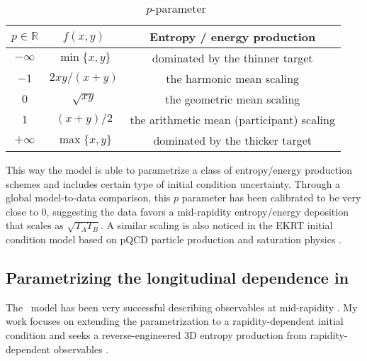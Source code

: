 \begin{table}
\centering
\caption{\trento\ $p$-parameter}\label{tab:trento-p}
\begin{tabular}{ccc}
\hline
$p\in \mathbb{R}$ & $f(x, y)$ & Entropy / energy production\\
\hline
$-\infty$ & $\min\{x, y\}$ &  dominated by the thinner target\\
$-1$ & $2xy/(x+y)$ &   the harmonic mean scaling\\
$0$ & $\sqrt{xy}$ &  the geometric mean scaling\\
$1$ & $(x+y)/2$ &  the arithmetic mean (participant) scaling\\
$+\infty$ & $\max\{x, y\}$ &  dominated by the thicker target \\
\hline
\end{tabular}
\end{table}
This way the model is able to parametrize a class of entropy/energy production schemes and includes certain type of initial condition uncertainty.
Through a global model-to-data comparison, this $p$ parameter has been calibrated to be very close to 0, suggesting the data favors a mid-rapidity entropy/energy deposition that scales as $\sqrt{T_A T_B}$.
A similar scaling is also noticed in the EKRT initial condition model based on pQCD particle production and saturation physics \cite{Eskola:1999fc}.

\subsection{Parametrizing the longitudinal dependence in \trento}
The \trento\ model has been very successful describing observables at mid-rapidity \cite{Moreland:2014oya,Bernhard:2016tnd,Moreland:2018gsh}.
My work focuses on extending the parametrization to a rapidity-dependent initial condition and seeks a reverse-engineered 3D entropy production from rapidity-dependent observables \cite{PhysRevC.96.044912}.

